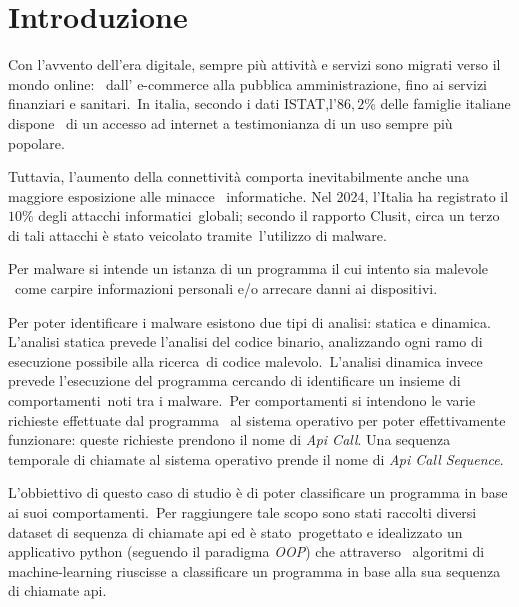 \newcommand{\percc}[1]{$#1$\%}

\chapter{Introduzione}



Con l'avvento dell'era digitale, sempre più attività e servizi sono migrati verso il mondo online: \
dall' e-commerce alla pubblica amministrazione, fino ai servizi finanziari e sanitari.\
In italia, secondo i dati ISTAT\cite{istat.internet-usage},l'\percc{86,2} delle famiglie italiane dispone \
di un accesso ad internet a testimonianza di un uso sempre più popolare.

Tuttavia, l'aumento della connettività comporta inevitabilmente anche una maggiore esposizione alle minacce \
informatiche. Nel 2024, l'Italia ha registrato il \percc{10} degli attacchi informatici\
globali\cite{clusit.italy-malware}; secondo il rapporto Clusit\cite{clusit.italy-malware}, circa un terzo di tali attacchi è stato veicolato tramite\
l'utilizzo di malware.

Per malware si intende un istanza di un programma il cui intento sia malevole\cite{idika2007survey} \
come carpire informazioni personali e/o arrecare danni ai dispositivi.

Per poter identificare i malware esistono due tipi di analisi: statica e dinamica\cite{doi:10.1155/2015/659101}.
L'analisi statica prevede l'analisi del codice binario, analizzando ogni ramo di esecuzione possibile alla ricerca\
di codice malevolo.\
L'analisi dinamica invece prevede l'esecuzione del programma cercando di identificare un insieme di comportamenti\
noti tra i malware.\
Per comportamenti si intendono le varie richieste effettuate dal programma \
al sistema operativo per poter effettivamente funzionare: queste richieste prendono il nome di \textit{Api Call}.
Una sequenza temporale di chiamate al sistema operativo prende il nome di \textit{Api Call Sequence}.


L'obbiettivo di questo caso di studio è di poter classificare un programma in base ai suoi comportamenti.\
Per raggiungere tale scopo sono stati raccolti diversi dataset di sequenza di chiamate api ed è stato\
progettato e idealizzato un applicativo python (seguendo il paradigma \textit{OOP}) che attraverso \
algoritmi di machine-learning riuscisse a classificare un programma in base alla sua sequenza di chiamate api.

